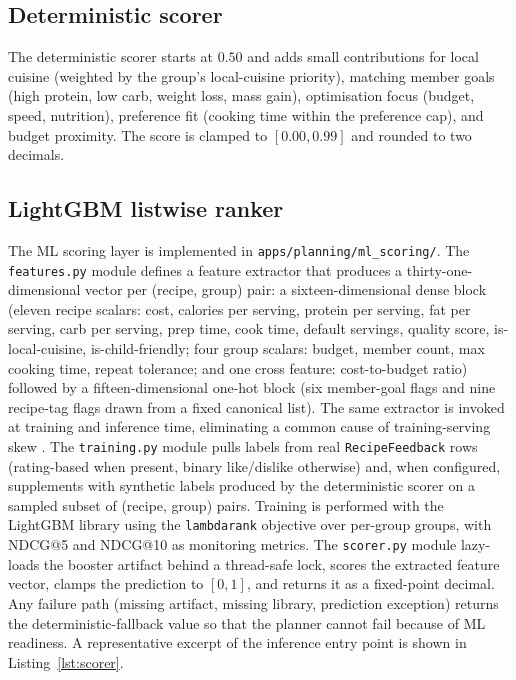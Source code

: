 \subsection{Deterministic scorer}

The deterministic scorer starts at $0.50$ and adds small contributions for local cuisine (weighted by the group's local-cuisine priority), matching member goals (high protein, low carb, weight loss, mass gain), optimisation focus (budget, speed, nutrition), preference fit (cooking time within the preference cap), and budget proximity. The score is clamped to $[0.00, 0.99]$ and rounded to two decimals.

\subsection{LightGBM listwise ranker}

The ML scoring layer is implemented in \texttt{apps/planning/ml\_scoring/}. The \texttt{features.py} module defines a feature extractor that produces a thirty-one-dimensional vector per (recipe, group) pair: a sixteen-dimensional dense block (eleven recipe scalars: cost, calories per serving, protein per serving, fat per serving, carb per serving, prep time, cook time, default servings, quality score, is-local-cuisine, is-child-friendly; four group scalars: budget, member count, max cooking time, repeat tolerance; and one cross feature: cost-to-budget ratio) followed by a fifteen-dimensional one-hot block (six member-goal flags and nine recipe-tag flags drawn from a fixed canonical list). The same extractor is invoked at training and inference time, eliminating a common cause of training-serving skew \cite{sculley2015}. The \texttt{training.py} module pulls labels from real \texttt{RecipeFeedback} rows (rating-based when present, binary like/dislike otherwise) and, when configured, supplements with synthetic labels produced by the deterministic scorer on a sampled subset of (recipe, group) pairs. Training is performed with the LightGBM library \cite{ke2017} using the \texttt{lambdarank} objective over per-group groups, with NDCG@5 and NDCG@10 as monitoring metrics. The \texttt{scorer.py} module lazy-loads the booster artifact behind a thread-safe lock, scores the extracted feature vector, clamps the prediction to $[0, 1]$, and returns it as a fixed-point decimal. Any failure path (missing artifact, missing library, prediction exception) returns the deterministic-fallback value so that the planner cannot fail because of ML readiness. A representative excerpt of the inference entry point is shown in Listing~\ref{lst:scorer}.

